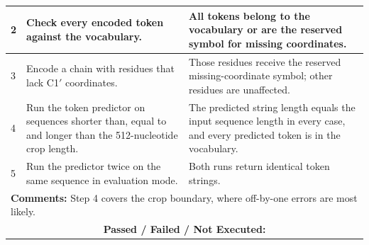 \documentclass{FastFyp}
\begin{document}
{\begin{longtable}{|p{2.4cm}|p{4.6cm}|p{2.4cm}|p{3.8cm}|}
2 & Check every encoded token against the vocabulary. & \multicolumn{2}{p{6.64cm}|}{All tokens belong to the vocabulary or are the reserved symbol for missing coordinates.} \\ \hline
3 & Encode a chain with residues that lack C1$'$ coordinates. & \multicolumn{2}{p{6.64cm}|}{Those residues receive the reserved missing-coordinate symbol; other residues are unaffected.} \\ \hline
4 & Run the token predictor on sequences shorter than, equal to and longer than the 512-nucleotide crop length. & \multicolumn{2}{p{6.64cm}|}{The predicted string length equals the input sequence length in every case, and every predicted token is in the vocabulary.} \\ \hline
5 & Run the predictor twice on the same sequence in evaluation mode. & \multicolumn{2}{p{6.64cm}|}{Both runs return identical token strings.} \\ \hline
\multicolumn{4}{|p{14.51cm}|}{\textbf{Comments:} Step 4 covers the crop boundary, where off-by-one errors are most likely.} \\ \hline
\multicolumn{4}{|c|}{\textbf{Passed / Failed / Not Executed:}} \\ \hline
\end{longtable}
}
\end{document}
